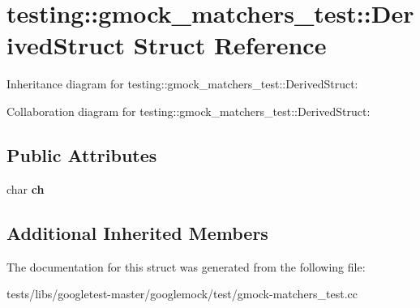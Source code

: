 \hypertarget{structtesting_1_1gmock__matchers__test_1_1DerivedStruct}{}\section{testing\+:\+:gmock\+\_\+matchers\+\_\+test\+:\+:Derived\+Struct Struct Reference}
\label{structtesting_1_1gmock__matchers__test_1_1DerivedStruct}


Inheritance diagram for testing\+:\+:gmock\+\_\+matchers\+\_\+test\+:\+:Derived\+Struct\+:


Collaboration diagram for testing\+:\+:gmock\+\_\+matchers\+\_\+test\+:\+:Derived\+Struct\+:
\subsection*{Public Attributes}
\begin{DoxyCompactItemize}
\item 
\mbox{\label{structtesting_1_1gmock__matchers__test_1_1DerivedStruct_abd7de960817b2c889f109ae6f2869f4c}} 
char {\bfseries ch}
\end{DoxyCompactItemize}
\subsection*{Additional Inherited Members}


The documentation for this struct was generated from the following file\+:\begin{DoxyCompactItemize}
\item 
tests/libs/googletest-\/master/googlemock/test/gmock-\/matchers\+\_\+test.\+cc\end{DoxyCompactItemize}
